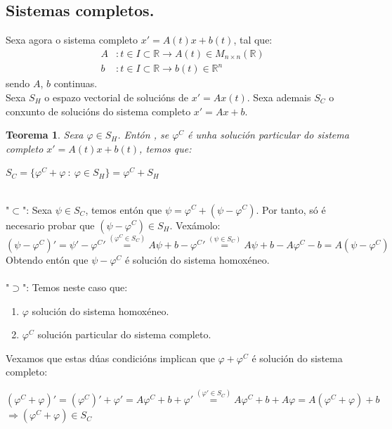 \documentclass[11pt, a4paper,twoside]{article}
\makeatletter
\theoremstyle{theorem-style}  %
\newtheorem{theorem}{Teorema}[section]  %
\renewenvironment{proof}[1][\proofname]{\par
	\pushQED{\qed}%
	\normalfont \topsep6\p@\@plus6\p@\relax
	\list{}{%
		\settowidth{\leftmargin}{\quad:\hskip\labelsep}%
		\setlength{\labelwidth}{0pt}%
		\setlength{\itemindent}{-\leftmargin}%
	}%
	\item[\hskip\labelsep\itshape#1\@addpunct{:}]\ignorespaces
}{%
	\popQED\endlist\@endpefalse
}
\theoremstyle{definition-style}
\theoremstyle{example-style}
\makeatother
\begin{document}
\subsection{Sistemas completos.}
Sexa agora o sistema completo $x' = A(t)x + b(t)$, tal que:
\begin{align*}
	A &: t \in I \subset \mathbb{R} \longrightarrow A(t) \in M_{n \times n} (\mathbb{R}) \\
	b &: t \in I \subset \mathbb{R} \longrightarrow b(t) \in \mathbb{R}^n
\end{align*}
sendo $A$, $b$ continuas.\\
Sexa $S_H$ o espazo vectorial de solucións de $x' = Ax(t)$. Sexa ademais $S_C$ o conxunto de solucións do sistema completo $x' = Ax + b$.
\begin{theorem}
	Sexa $\varphi \in S_H$. Entón , se $ \varphi^C $ é unha solución particular do sistema completo $  x' = A(t)x + b(t) $, temos que:
	\begin{center}
		$S_C = \{ \varphi^C + \varphi \ : \ \varphi \in S_H  \} = \varphi^C + S_H$
	\end{center}
\end{theorem}
\begin{proof}\ \\ 
	"$\subset$": Sexa $\psi \in S_C$, temos entón que $\psi = \varphi^C + (\psi - \varphi^C)$. Por tanto, só é necesario probar que $(\psi - \varphi^C) \in S_H$. Vexámolo: 
	\[ (\psi - \varphi^C )' = \psi' - \varphi^C{'} \stackrel{(\varphi^C \in S_C)}{=} A \psi + b - \varphi^C{'} \stackrel{(\psi \in S_C)}{=} A\psi + b - A \varphi^C - b = A (\psi - \varphi^C) \]
	Obtendo entón que $\psi - \varphi^C$ é solución do sistema homoxéneo.\\ \\
	"$\supset$": Temos neste caso que:
	\begin{enumerate}
		\item $\varphi$ solución do sistema homoxéneo.
		\item $\varphi^C$ solución particular do sistema completo.
	\end{enumerate}
	Vexamos que estas dúas condicións implican que $\varphi + \varphi^C$ é solución do sistema completo:
	\begin{center}
		$(\varphi^C + \varphi)' = (\varphi^C)' + \varphi' = A\varphi^C + b + \varphi' \stackrel{(\varphi' \in S_C)}{=} A\varphi^C + b + A\varphi =
		A(\varphi^C + \varphi) + b$ \\
		$ \Rightarrow (\varphi^C + \varphi) \in S_C$
	\end{center}
\end{proof}
\end{document}
